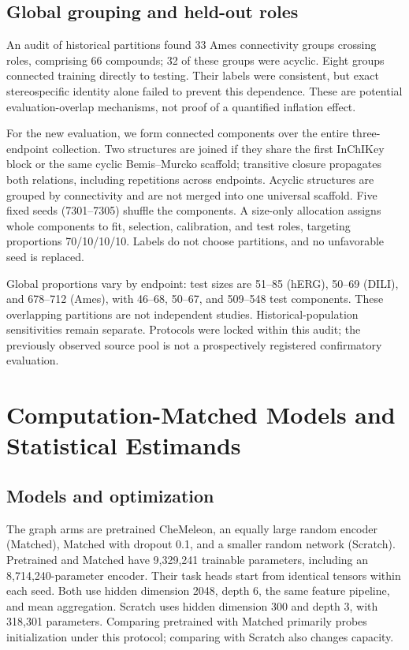 \documentclass[runningheads,a4paper]{llncs}
\begin{document}
\subsection{Global grouping and held-out roles}
An audit of historical partitions found 33 Ames connectivity groups crossing roles, comprising 66 compounds; 32 of these groups were acyclic. Eight groups connected training directly to testing. Their labels were consistent, but exact stereospecific identity alone failed to prevent this dependence. These are potential evaluation-overlap mechanisms, not proof of a quantified inflation effect.

For the new evaluation, we form connected components over the entire three-endpoint collection. Two structures are joined if they share the first InChIKey block or the same cyclic Bemis--Murcko scaffold; transitive closure propagates both relations, including repetitions across endpoints. Acyclic structures are grouped by connectivity and are not merged into one universal scaffold. Five fixed seeds (7301--7305) shuffle the components. A size-only allocation assigns whole components to fit, selection, calibration, and test roles, targeting proportions 70/10/10/10. Labels do not choose partitions, and no unfavorable seed is replaced.

Global proportions vary by endpoint: test sizes are 51--85 (hERG), 50--69 (DILI), and 678--712 (Ames), with 46--68, 50--67, and 509--548 test components. These overlapping partitions are not independent studies. Historical-population sensitivities remain separate. Protocols were locked within this audit; the previously observed source pool is not a prospectively registered confirmatory evaluation.

\section{Computation-Matched Models and Statistical Estimands}
\subsection{Models and optimization}
The graph arms are pretrained CheMeleon, an equally large random encoder (Matched), Matched with dropout 0.1, and a smaller random network (Scratch). Pretrained and Matched have 9,329,241 trainable parameters, including an 8,714,240-parameter encoder. Their task heads start from identical tensors within each seed. Both use hidden dimension 2048, depth 6, the same feature pipeline, and mean aggregation. Scratch uses hidden dimension 300 and depth 3, with 318,301 parameters. Comparing pretrained with Matched primarily probes initialization under this protocol; comparing with Scratch also changes capacity.
\end{document}
